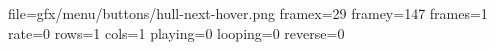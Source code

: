 file=gfx/menu/buttons/hull-next-hover.png
framex=29
framey=147
frames=1
rate=0
rows=1
cols=1
playing=0
looping=0
reverse=0